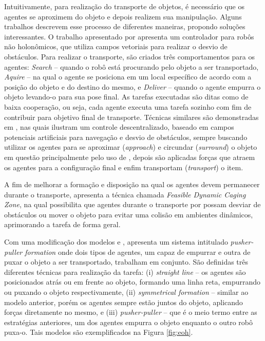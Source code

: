 
Intuitivamente, para realização do transporte de objetos, é necessário que os agentes se aproximem do objeto e depois realizem sua manipulação. Alguns trabalhos descrevem esse processo de diferentes maneiras, propondo soluções interessantes.
%
O trabalho apresentado por \cite{Emery2001} apresenta um controlador para robôs não holonômicos, que utiliza campos vetoriais para realizar o desvio de obstáculos. Para realizar o transporte, são criados três comportamentos para os agentes: \emph{Search} -- quando o robô está procurando pelo objeto a ser transportado, \emph{Aquire} -- na qual o agente se posiciona em um local específico de acordo com a posição do objeto e do destino do mesmo, e \emph{Deliver} -- quando o agente empurra o objeto levando-o para sua pose final. As tarefas executadas são ditas como de baixa cooperação, ou seja, cada agente executa uma tarefa sozinho com fim de contribuir para objetivo final de transporte.
%
Técnicas similares são demonstradas em \cite{Song2002, Wang2002, Pereira2004, Fink2008}, nas quais ilustram um controle descentralizado, baseado em campos potenciais artificiais para navegação e desvio de obstáculos, sempre buscando utilizar os agentes para se aproximar (\emph{approach}) e circundar (\emph{surround}) o objeto em questão principalmente pelo uso de , depois são aplicadas forças que atraem os agentes para a configuração final e enfim transportam (\emph{transport}) o item.

A fim de melhorar a formação e disposição na qual os agentes devem permanecer durante o transporte, \cite{Magariyama2014} apresenta a técnica chamada \emph{Feasible Dynamic Caging Zone}, na qual possibilita que agentes durante o transporte por  possam desviar de obstáculos ou mover o objeto para evitar uma colisão em ambientes dinâmicos, aprimorando a tarefa de forma geral.

Com uma modificação dos modelos  e , \cite{Eoh2011} apresenta um sistema intitulado \emph{pusher-puller formation} onde dois tipos de agentes, um capaz de empurrar e outra de puxar o objeto a ser transportado, trabalham em conjunto. São definidas três diferentes técnicas para realização da tarefa:
(i) \emph{straight line} -- os agentes são posicionados atrás ou em frente ao objeto, formando uma linha reta, empurrando ou puxando o objeto respectivamente,
(ii) \emph{symmetrical formation} -- similar ao modelo anterior, porém os agentes sempre estão juntos do objeto, aplicando forças diretamente no mesmo, e
(iii) \emph{pusher-puller} -- que é o meio termo entre as estratégias anteriores, um dos agentes empurra o objeto enquanto o outro robô puxa-o. Tais modelos são exemplificados na Figura \ref{fig:eoh}.

